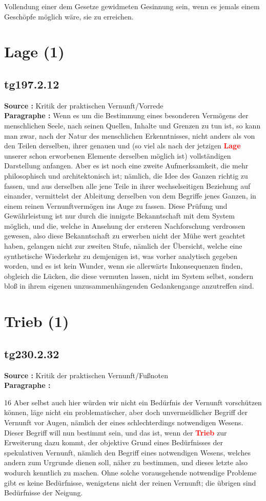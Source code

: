\documentclass[a4paper,12pt,twoside]{book}
\newcommand{\match}[1]{\textcolor{red}{\textbf{#1}}}
\newcommand{\unnumberedsection}[1]{
	\section*{#1}
	\addcontentsline{toc}{section}{#1}
	\markright{#1}
}
\begin{document}
Vollendung einer dem Gesetze gewidmeten Gesinnung sein, wenn es jemals einem Geschöpfe möglich wäre, sie zu erreichen. 
	
	\unnumberedsection{Lage (1)} 
	\subsection*{tg197.2.12} 
	\textbf{Source : }Kritik der praktischen Vernunft/Vorrede\\  
	
	\textbf{Paragraphe : }Wenn es um die Bestimmung eines besonderen Vermögens der menschlichen Seele, nach seinen Quellen, Inhalte und Grenzen zu tun ist, so kann man zwar, nach der Natur  des menschlichen Erkenntnisses, nicht anders als von den Teilen derselben, ihrer genauen und (so viel als nach der jetzigen \match{Lage} unserer schon erworbenen Elemente derselben möglich ist) vollständigen Darstellung anfangen. Aber es ist noch eine zweite Aufmerksamkeit, die mehr philosophisch und architektonisch ist; nämlich, die Idee des Ganzen richtig zu fassen, und aus derselben alle jene Teile in ihrer wechselseitigen Beziehung auf einander, vermittelst der Ableitung derselben von dem Begriffe jenes Ganzen, in einem reinen Vernunftvermögen ins Auge zu fassen. Diese Prüfung und Gewährleistung ist nur durch die innigste Bekanntschaft mit dem System möglich, und die, welche in Ansehung der ersteren Nachforschung verdrossen gewesen, also diese Bekanntschaft zu erwerben nicht der Mühe wert geachtet haben, gelangen nicht zur zweiten Stufe, nämlich der Übersicht, welche eine synthetische Wiederkehr zu demjenigen ist, was vorher analytisch gegeben worden, und es ist kein Wunder, wenn sie allerwärts Inkonsequenzen finden, obgleich die Lücken, die diese vermuten lassen, nicht im System selbst, sondern bloß in ihrem eigenen unzusammenhängenden Gedankengange anzutreffen sind. 
	
	\unnumberedsection{Trieb (1)} 
	\subsection*{tg230.2.32} 
	\textbf{Source : }Kritik der praktischen Vernunft/Fußnoten\\  
	
	\textbf{Paragraphe : }
	
	16 Aber selbst auch hier würden wir nicht ein Bedürfnis der Vernunft vorschützen können, läge nicht ein problematischer, aber doch unvermeidlicher Begriff der Vernunft vor Augen, nämlich der eines schlechterdings notwendigen Wesens. Dieser Begriff will nun bestimmt sein, und das ist, wenn der \match{Trieb} zur Erweiterung dazu kommt, der objektive Grund eines Bedürfnisses der spekulativen Vernunft, nämlich den Begriff eines notwendigen Wesens, welches andern zum Urgrunde dienen soll, näher zu bestimmen, und dieses letzte also wodurch kenntlich zu machen. Ohne solche vorausgehende notwendige Probleme gibt es keine Bedürfnisse, wenigstens nicht der reinen Vernunft; die übrigen sind Bedürfnisse der Neigung. 
	
\end{document}
